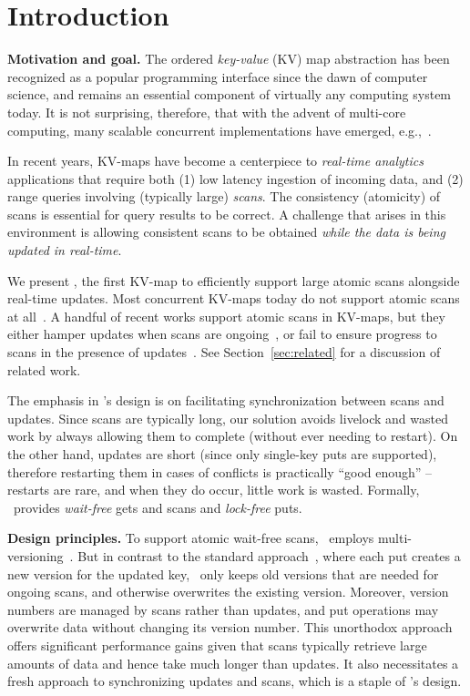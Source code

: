 \section{Introduction}
\label{sec:intro}

{\bf{Motivation and goal.}} The ordered \emph{key-value} (KV) map abstraction has been recognized as a popular programming interface
since the dawn of computer science, and remains an essential component of virtually any computing system today.
It is not surprising, therefore, that with the advent of multi-core computing,  many scalable concurrent
implementations have emerged,
e.g.,~\cite{JavaConcurrentSkipList,LinkedListBP,BraginskyP2012,Hendler04,Kogan12,NatarajanM2014}.

In recent years, KV-maps have become a centerpiece to \emph{real-time analytics}  applications that
require both
(1) low latency ingestion of incoming data, and (2) range queries involving (typically large) \emph{scans}.  
The consistency (atomicity) of scans is essential for  query results to be correct.
A  challenge that arises in this environment is allowing consistent scans
to be obtained \emph{while the data is being updated in real-time}.

We present {\kiwi}, the first KV-map to efficiently support large atomic
scans  alongside real-time updates.
Most concurrent KV-maps today do not support atomic scans at all~\cite{JavaConcurrentSkipList,LinkedListBP,BraginskyP2012,Hendler04,NatarajanM2014,Kogan12,Lomet13,ArbelGHK15}.
A handful of recent works support atomic scans in KV-maps, but they either
hamper updates when scans are ongoing~\cite{BronsonCCO2010,Prokopec12},
or fail to ensure progress to scans in the presence of updates~\cite{BrownA12}.
See Section~\ref{sec:related} for a discussion of related work.

The emphasis in \kiwi's design is on facilitating synchronization between 
scans and updates. Since scans are typically long, our solution avoids livelock 
and wasted work by always allowing them to complete (without ever needing to 
restart). On the other hand, updates are short (since only single-key puts are supported), 
therefore restarting them in cases of conflicts is practically ``good enough'' -- 
restarts are rare, and when they do occur, little work is wasted. 
Formally, \kiwi\  provides \emph{wait-free} gets and scans and \emph{lock-free} puts.


{\bf{Design principles.}}
To support atomic wait-free scans, \kiwi\ employs multi-versioning~\cite{BHG:Book87}. But in contrast to the standard approach~\cite{mv-stm-chapter}, where each put creates a new version for the updated key, \kiwi\ only keeps old versions that are needed for ongoing scans, and otherwise overwrites the existing version. Moreover, version numbers are managed by scans rather than updates, and put operations may
overwrite data without changing its version number. This unorthodox approach offers significant performance gains given that scans typically retrieve large amounts of data and hence take much longer than  updates.
It also necessitates a fresh approach to synchronizing updates and scans, which is a staple of \kiwi's design.

